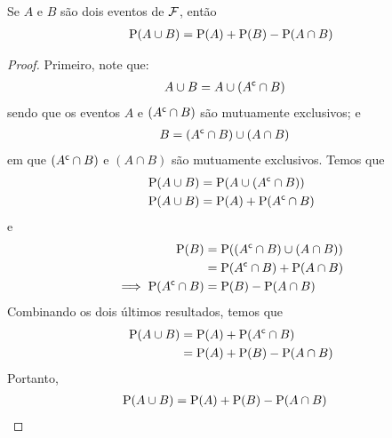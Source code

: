 \begin{lemma}\label{lem:ch01-uniao-dois}
    Se $A$ e $B$ são dois eventos de $\operatorname{\mathcal{F}}$, então
    \begin{align}
        \operatorname{P}(A \cup B) = \operatorname{P}(A) + \operatorname{P}(B) - \operatorname{P}(A \cap B)
            \label{eq:ch01-uniao-dois}
    \end{align}
\end{lemma}

\begin{proof}
    Primeiro, note que:
    \begin{align*}
        A \cup B &= A \cup ({A}^{\mathsf{c}} \cap B)
    \end{align*}
    sendo que os eventos $A$ e $({A}^{\mathsf{c}} \cap B)$ são mutuamente exclusivos; e
    \begin{align*}
        B &= ({A}^{\mathsf{c}} \cap B) \cup (A \cap B)
    \end{align*}
    em que $({A}^{\mathsf{c}} \cap B)$ e $(A \cap B)$ são mutuamente exclusivos.
    Temos que
    \begin{align*}
        \operatorname{P}(A \cup B) &= \operatorname{P}(A \cup ({A}^{\mathsf{c}} \cap B)) \\
        \operatorname{P}(A \cup B) &= \operatorname{P}(A) + \operatorname{P}({A}^{\mathsf{c}} \cap B)
    \end{align*}
    e
    \begin{align*}
        \operatorname{P}(B) &= \operatorname{P}(({A}^{\mathsf{c}} \cap B) \cup (A \cap B)) \\
        &= \operatorname{P}({A}^{\mathsf{c}} \cap B) + \operatorname{P}(A \cap B) \\
        \implies \operatorname{P}({A}^{\mathsf{c}} \cap B) 
        &= \operatorname{P}(B) - \operatorname{P}(A \cap B)
    \end{align*}
    Combinando os dois últimos resultados, temos que
    \begin{align*}
        \operatorname{P}(A \cup B) &= \operatorname{P}(A) + \operatorname{P}({A}^{\mathsf{c}} \cap B) \\
        &= \operatorname{P}(A) + \operatorname{P}(B) - \operatorname{P}(A \cap B)
    \end{align*}
    Portanto,
    \begin{align*}
        \operatorname{P}(A \cup B)
            &= \operatorname{P}(A) + \operatorname{P}(B) - \operatorname{P}(A \cap B)
    \end{align*}
\end{proof}

